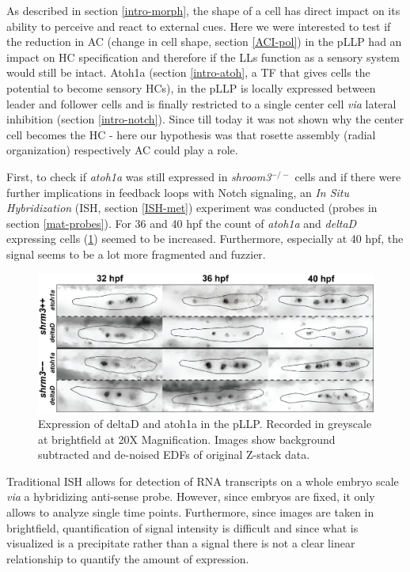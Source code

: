 \documentclass[11pt,singlespacinge,twoside]{reedthesis} %
\theoremstyle{definition}
\theoremstyle{definition}
\theoremstyle{definition}
\theoremstyle{remark}
\begin{document}
As described in section \ref{intro-morph}, the shape of a cell has direct impact on its ability to perceive and react to external cues. Here we were interested to test if the reduction in AC (change in cell shape, section \ref{ACI-pol}) in the pLLP had an impact on HC specification and therefore if the LLs function as a sensory system would still be intact. Atoh1a (section \ref{intro-atoh}, a TF that gives cells the potential to become sensory HCs), in the pLLP is locally expressed between leader and follower cells and is finally restricted to a single center cell \emph{via} lateral inhibition (section \ref{intro-notch}). Since till today it was not shown why the center cell becomes the HC - here our hypothesis was that rosette assembly (radial organization) respectively AC could play a role.

First, to check if \emph{atoh1a} was still expressed in \emph{shroom3}\(^{-/-}\) cells and if there were further implications in feedback loops with Notch signaling, an \emph{In Situ Hybridization} (ISH, section \ref{ISH-met}) experiment was conducted (probes in section \ref{mat-probes}). For 36 and 40 hpf the count of \emph{atoh1a} and \emph{deltaD} expressing cells (\ref{fig:hcish}) seemed to be increased. Furthermore, especially at 40 hpf, the signal seems to be a lot more fragmented and fuzzier.


\begin{figure}

{\centering \includegraphics[width=0.85\linewidth]{figures/results/05_atoh/hc_ish} 

}

\caption[Expression of deltaD and atoh1a in the pLLP]{Expression of deltaD and atoh1a in the pLLP. Recorded in greyscale at brightfield at 20X Magnification. Images show background subtracted and de-noised EDFs of original Z-stack data.}\label{fig:hcish}
\end{figure}
Traditional ISH allows for detection of RNA transcripts on a whole embryo scale \emph{via} a hybridizing anti-sense probe. However, since embryos are fixed, it only allows to analyze single time points. Furthermore, since images are taken in brightfield, quantification of signal intensity is difficult and since what is visualized is a precipitate rather than a signal there is not a clear linear relationship to quantify the amount of expression.
\end{document}
